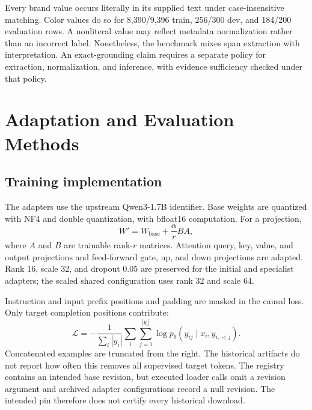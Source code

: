 Every brand value occurs literally in its supplied text under case-insensitive matching. Color values do so for 8,390/9,396 train, 256/300 dev, and 184/200 evaluation rows. A nonliteral value may reflect metadata normalization rather than an incorrect label. Nonetheless, the benchmark mixes span extraction with interpretation. An exact-grounding claim requires a separate policy for extraction, normalization, and inference, with evidence sufficiency checked under that policy.

\section{Adaptation and Evaluation Methods}
\subsection{Training implementation}
The adapters use the upstream Qwen3-1.7B identifier. Base weights are quantized with NF4 and double quantization, with bfloat16 computation. For a projection,
\begin{equation}
W'=W_{\mathrm{base}}+\frac{\alpha}{r}BA,
\end{equation}
where $A$ and $B$ are trainable rank-$r$ matrices. Attention query, key, value, and output projections and feed-forward gate, up, and down projections are adapted. Rank 16, scale 32, and dropout 0.05 are preserved for the initial and specialist adapters; the scaled shared configuration uses rank 32 and scale 64.

Instruction and input prefix positions and padding are masked in the causal loss. Only target completion positions contribute:
\begin{equation}
\mathcal L=-\frac{1}{\sum_i|y_i|}\sum_i\sum_{j=1}^{|y_i|}
\log p_\theta(y_{ij}\mid x_i,y_{i,<j}).
\end{equation}
Concatenated examples are truncated from the right. The historical artifacts do not report how often this removes all supervised target tokens. The registry contains an intended base revision, but executed loader calls omit a revision argument and archived adapter configurations record a null revision. The intended pin therefore does not certify every historical download.

